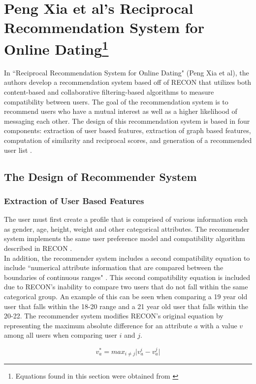 \documentclass[11pt]{article}
\begin{document}
\section{Peng Xia et al's Reciprocal Recommendation System for Online Dating\footnote{Equations found in this section were obtained from \cite{recip}}}
In ``Reciprocal Recommendation System for Online Dating" (Peng Xia et al), the authors develop a recommendation system based off of RECON that utilizes both content-based and collaborative filtering-based algorithms to measure compatibility between users. The goal of the recommendation system is to recommend users who have a mutual interest as well as a higher likelihood of messaging each other. The design of this recommendation system is based in four components: extraction of user based features, extraction of graph based features, computation of similarity and reciprocal scores, and generation of a recommended user list \cite{recip}.

\subsection{The Design of Recommender System}
\subsubsection{Extraction of User Based Features}
The user must first create a profile that is comprised of various information such as gender, age, height, weight and other categorical attributes. The recommender system implements the same user preference model and compatibility algorithm described in RECON  \cite{RECON}.\\
\indent In addition, the recommender system includes a second compatibility equation to include ``numerical attribute information that are compared between the boundaries of continuous ranges" \cite{recip}. This second compatibility equation is included due to RECON's inability to compare two users that do not fall within the same categorical group. An example of this can be seen when comparing a 19 year old user that falls within the 18-20 range and a 21 year old user that falls within the 20-22. The recommender system modifies RECON's original equation by representing the maximum absolute difference for an attribute $a$ with a value $v$ among all users when comparing user $i$ and $j$.

\begin{equation}
    v_a^* = max_{i \neq j} \lvert v_a^i-v_a^j\rvert
\end{equation}
\end{document}
